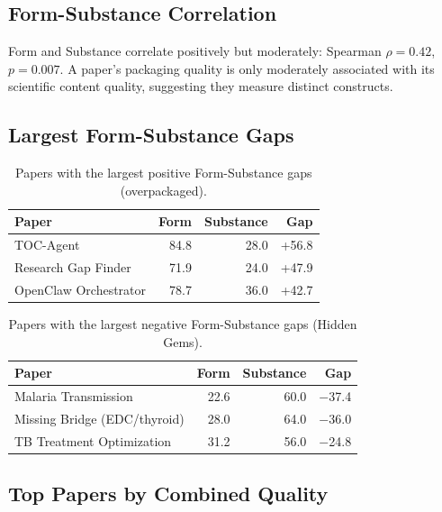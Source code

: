 \documentclass[11pt, a4paper]{article}
\begin{document}
\subsection{Form-Substance Correlation}

Form and Substance correlate positively but moderately: Spearman $\rho = 0.42$, $p = 0.007$. A paper's packaging quality is only moderately associated with its scientific content quality, suggesting they measure distinct constructs.

\subsection{Largest Form-Substance Gaps}

\begin{table}[H]
\centering
\caption{Papers with the largest positive Form-Substance gaps (overpackaged).}
\begin{tabular}{@{}lrrr@{}}
\toprule
\textbf{Paper} & \textbf{Form} & \textbf{Substance} & \textbf{Gap} \\
\midrule
TOC-Agent & 84.8 & 28.0 & +56.8 \\
Research Gap Finder & 71.9 & 24.0 & +47.9 \\
OpenClaw Orchestrator & 78.7 & 36.0 & +42.7 \\
\bottomrule
\end{tabular}
\end{table}

\begin{table}[H]
\centering
\caption{Papers with the largest negative Form-Substance gaps (Hidden Gems).}
\begin{tabular}{@{}lrrr@{}}
\toprule
\textbf{Paper} & \textbf{Form} & \textbf{Substance} & \textbf{Gap} \\
\midrule
Malaria Transmission & 22.6 & 60.0 & $-$37.4 \\
Missing Bridge (EDC/thyroid) & 28.0 & 64.0 & $-$36.0 \\
TB Treatment Optimization & 31.2 & 56.0 & $-$24.8 \\
\bottomrule
\end{tabular}
\end{table}

\subsection{Top Papers by Combined Quality}
\end{document}
